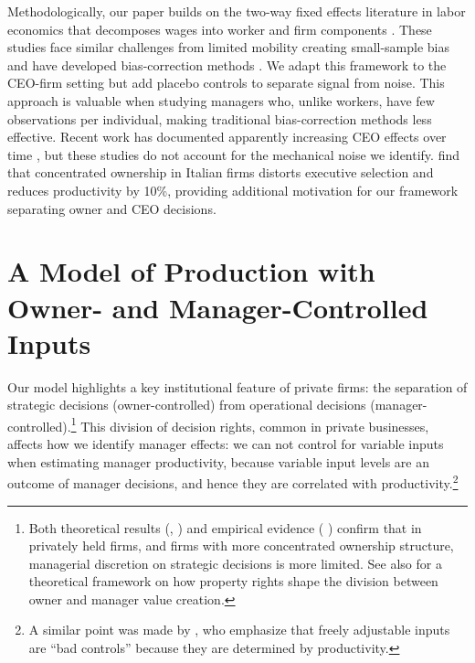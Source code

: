 \documentclass[11pt,a4paper]{article}
\begin{document}
Methodologically, our paper builds on the two-way fixed effects literature in labor economics that decomposes wages into worker and firm components \citep{Abowd1999Econometrica, Card2018JoLE}. These studies face similar challenges from limited mobility creating small-sample bias \citep{andrews2008high} and have developed bias-correction methods \citep{Bonhomme2023-dx, gaure2014correlation}. We adapt this framework to the CEO-firm setting but add placebo controls to separate signal from noise. This approach is valuable when studying managers who, unlike workers, have few observations per individual, making traditional bias-correction methods less effective. Recent work has documented apparently increasing CEO effects over time \citep{quigley2015has}, but these studies do not account for the mechanical noise we identify. \citet{lippi2014corporate} find that concentrated ownership in Italian firms distorts executive selection and reduces productivity by 10\%, providing additional motivation for our framework separating owner and CEO decisions.

\section{A Model of Production with Owner- and Manager-Controlled Inputs}

Our model highlights a key institutional feature of private firms: the separation of strategic decisions (owner-controlled) from operational decisions (manager-controlled).\footnote{Both theoretical results (\citep{fama1983separation, jensen1976theory}, \citet{burkart2003family}) and empirical evidence (\citep{wang2019decentralization, buffington2017mops} \citet{bloom2012organization}) confirm that in privately held firms, and firms with more concentrated ownership structure, managerial discretion on strategic decisions is more limited. See also \citet{schulze2021property} for a theoretical framework on how property rights shape the division between owner and manager value creation.} This division of decision rights, common in private businesses, affects how we identify manager effects: we can not control for variable inputs when estimating manager productivity, because variable input levels are an outcome of manager decisions, and hence they are correlated with productivity.\footnote{A similar point was made by \citet{Gandhi2020-nu}, who emphasize that freely adjustable inputs are ``bad controls'' because they are determined by productivity.} 
\end{document}
